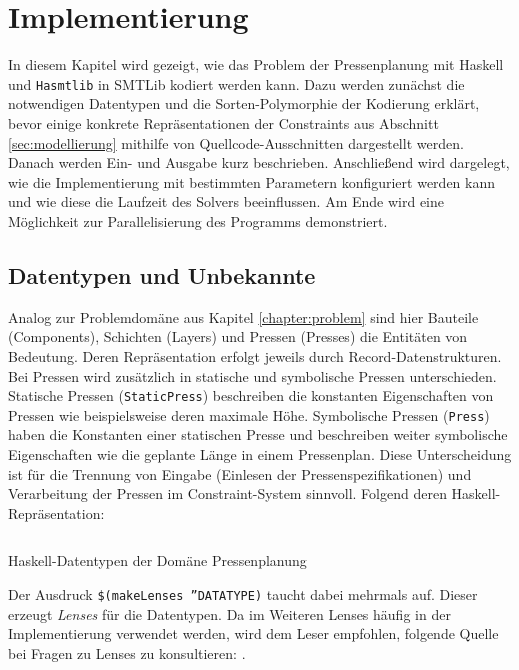\chapter{Implementierung}
\label{chapter:implementierung}
In diesem Kapitel wird gezeigt, wie das Problem der Pressenplanung mit Haskell und \texttt{Hasmtlib} in SMTLib kodiert werden kann.
Dazu werden zunächst die notwendigen Datentypen und die Sorten-Polymorphie der Kodierung erklärt, bevor einige konkrete Repräsentationen der Constraints aus
Abschnitt \ref{sec:modellierung} mithilfe von Quellcode-Ausschnitten dargestellt werden.
Danach werden Ein- und Ausgabe kurz beschrieben.
Anschließend wird dargelegt, wie die Implementierung mit bestimmten Parametern konfiguriert werden kann und wie diese die Laufzeit des Solvers beeinflussen.
Am Ende wird eine Möglichkeit zur Parallelisierung des Programms demonstriert.


\section{Datentypen und Unbekannte}
Analog zur Problemdomäne aus Kapitel \ref{chapter:problem} sind hier Bauteile (Components), Schichten (Layers) und Pressen (Presses)
die Entitäten von Bedeutung.
Deren Repräsentation erfolgt jeweils durch Record-Datenstrukturen.
Bei Pressen wird zusätzlich in statische und symbolische Pressen unterschieden.
Statische Pressen (\texttt{StaticPress}) beschreiben die konstanten Eigenschaften von Pressen wie beispielsweise deren maximale Höhe.
Symbolische Pressen (\texttt{Press}) haben die Konstanten einer statischen Presse und beschreiben weiter symbolische Eigenschaften wie die geplante Länge in einem Pressenplan.
Diese Unterscheidung ist für die Trennung von Eingabe (Einlesen der Pressenspezifikationen) und Verarbeitung der Pressen im Constraint-System sinnvoll.
Folgend deren Haskell-Repräsentation:

\begin{listing}[H]
    \inputminted[linenos=true]{haskell}{Code/Implementierung/Datatypes.hs}
    \caption{Haskell-Datentypen der Domäne Pressenplanung}
    \label{listing:datatypes}
\end{listing}

Der Ausdruck \texttt{\$(makeLenses ''DATATYPE)} taucht dabei mehrmals auf.
Dieser erzeugt \textit{Lenses} für die Datentypen.
Da im Weiteren Lenses häufig in der Implementierung verwendet werden, wird dem Leser empfohlen, folgende Quelle bei Fragen zu Lenses zu konsultieren: \cite{lenses}.

